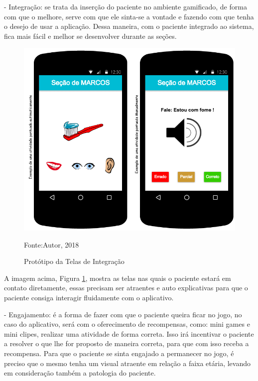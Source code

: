 \begin{itemize}
		 - Integração: se trata da inserção do paciente no ambiente gamificado, de forma com que o melhore, serve com que ele sinta-se a vontade e fazendo com que tenha o desejo de usar a aplicação. Dessa maneira, com o paciente integrado ao sistema, fica mais fácil e melhor se desenvolver durante as seções.
		
		\begin{figure}[H]
			\centering
			\includegraphics[scale=0.6]{img/integracaopaciente.png}
			\caption{Protótipo da Telas de Integração}
			Fonte:Autor, 2018
			\label{integracao}
		\end{figure}
		
		A imagem acima, Figura \ref{integracao}, mostra as telas nas quais o paciente estará em contato diretamente, essas precisam ser atraentes e auto explicativas para que o paciente consiga interagir fluidamente com o aplicativo.
		
		 - Engajamento: é a forma de fazer com que o paciente queira ficar no jogo, no caso do aplicativo, será com o oferecimento de recompensas, como: mini games e mini clipes, realizar uma atividade de forma correta. Isso irá incentivar o paciente a resolver o que lhe for proposto de maneira correta, para que com isso receba a recompensa. Para que o paciente se sinta engajado a permanecer no jogo, é preciso que o mesmo tenha um visual atraente em relação a faixa etária, levando em consideração também a patologia do paciente.
		

\end{itemize}
